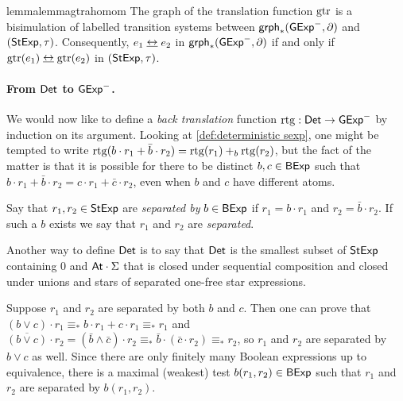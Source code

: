 \documentclass[orivec,envcountsect,envcountsame]{llncs}
\begin{document}
\begin{restatable}{lemma}{lemmagtrahomom}\label{lem:gtr is good stuff}
    The graph of the translation function \(\operatorname{gtr}\) is a bisimulation of labelled transition systems between $\mathsf{grph}_*(\mathsf{GExp}^-, \partial)$ and $(\mathsf{StExp}, \tau)$.
    Consequently, \(e_1 \bisim e_2\) in $\mathsf{grph}_*(\mathsf{GExp}^-, \partial)$ if and only if \(\gtr(e_1) \bisim \gtr(e_2)\) in $(\mathsf{StExp}, \tau)$.
\end{restatable}

\paragraph{\bf From \(\mathsf{Det}\) to $\mathsf{GExp}^-$.} %
We would now like to define a \emph{back translation} function \(\operatorname{rtg} : \mathsf{Det} \to \mathsf{GExp}^-\) by induction on its argument.
Looking at \cref{def:deterministic sexp}, one might be tempted to write \(\operatorname{rtg}(b \cdot r_1 + \bar b \cdot r_2) = \operatorname{rtg}(r_1) +_b \operatorname{rtg}(r_2)\), but the fact of the matter is that it is possible for there to be distinct \(b,c \in \mathsf{BExp}\) such that \(b \cdot r_1 + \bar b \cdot r_2 = c \cdot r_1 + \bar c \cdot r_2\), even when $b$ and $c$ have different atoms.

\begin{definition}
    Say that \(r_1, r_2 \in \mathsf{StExp}\) are \emph{separated by} \(b \in \mathsf{BExp}\) if \(r_1 = b\cdot r_1\) and \(r_2 = \bar b \cdot r_2\).
    If such a \(b\) exists we say that \(r_1\) and \(r_2\) are \emph{separated}.
\end{definition}

Another way to define \(\mathsf{Det}\) is to say that \(\mathsf{Det}\) is the smallest subset of \(\mathsf{StExp}\) containing \(0\) and \(\mathsf{At}\cdot\Sigma\) that is closed under sequential composition and closed under unions and stars of separated one-free star expressions.

Suppose \(r_1\) and \(r_2\) are separated by both \(b\) and \(c\).
Then one can prove that \((b \vee c)\cdot r_1 \equiv_* b\cdot r_1 + c\cdot r_1 \equiv_* r_1\) and \(\overline{(b \vee c)}\cdot r_2 = (\bar b \wedge \bar c)\cdot r_2 \equiv_* \bar b\cdot (\bar c \cdot r_2) \equiv_* r_2\), so \(r_1\) and \(r_2\) are separated by \(b \vee c\) as well.
Since there are only finitely many Boolean expressions up to equivalence, there is a maximal (weakest) test \(b(r_1,r_2) \in \mathsf{BExp}\) such that \(r_1\) and \(r_2\) are separated by \(b(r_1, r_2)\).
\end{document}

